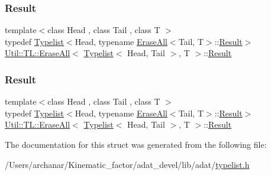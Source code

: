 \subsubsection{\texorpdfstring{Result}{Result}\hspace{0.1cm}{\footnotesize\ttfamily [1/2]}}
{\footnotesize\ttfamily template$<$class Head , class Tail , class T $>$ \\
typedef \mbox{\hyperlink{structUtil_1_1Typelist}{Typelist}}$<$Head, typename \mbox{\hyperlink{structUtil_1_1TL_1_1EraseAll}{Erase\+All}}$<$Tail, T$>$\+::\mbox{\hyperlink{structUtil_1_1TL_1_1EraseAll_3_01Typelist_3_01Head_00_01Tail_01_4_00_01T_01_4_aa724903cc91ed9eea3da277857c8f5aa}{Result}}$>$ \mbox{\hyperlink{structUtil_1_1TL_1_1EraseAll}{Util\+::\+T\+L\+::\+Erase\+All}}$<$ \mbox{\hyperlink{structUtil_1_1Typelist}{Typelist}}$<$ Head, Tail $>$, T $>$\+::\mbox{\hyperlink{structUtil_1_1TL_1_1EraseAll_3_01Typelist_3_01Head_00_01Tail_01_4_00_01T_01_4_aa724903cc91ed9eea3da277857c8f5aa}{Result}}}

\mbox{\label{structUtil_1_1TL_1_1EraseAll_3_01Typelist_3_01Head_00_01Tail_01_4_00_01T_01_4_aa724903cc91ed9eea3da277857c8f5aa}} 
\subsubsection{\texorpdfstring{Result}{Result}\hspace{0.1cm}{\footnotesize\ttfamily [2/2]}}
{\footnotesize\ttfamily template$<$class Head , class Tail , class T $>$ \\
typedef \mbox{\hyperlink{structUtil_1_1Typelist}{Typelist}}$<$Head, typename \mbox{\hyperlink{structUtil_1_1TL_1_1EraseAll}{Erase\+All}}$<$Tail, T$>$\+::\mbox{\hyperlink{structUtil_1_1TL_1_1EraseAll_3_01Typelist_3_01Head_00_01Tail_01_4_00_01T_01_4_aa724903cc91ed9eea3da277857c8f5aa}{Result}}$>$ \mbox{\hyperlink{structUtil_1_1TL_1_1EraseAll}{Util\+::\+T\+L\+::\+Erase\+All}}$<$ \mbox{\hyperlink{structUtil_1_1Typelist}{Typelist}}$<$ Head, Tail $>$, T $>$\+::\mbox{\hyperlink{structUtil_1_1TL_1_1EraseAll_3_01Typelist_3_01Head_00_01Tail_01_4_00_01T_01_4_aa724903cc91ed9eea3da277857c8f5aa}{Result}}}



The documentation for this struct was generated from the following file\+:\begin{DoxyCompactItemize}
\item 
/\+Users/archanar/\+Kinematic\+\_\+factor/adat\+\_\+devel/lib/adat/\mbox{\hyperlink{lib_2adat_2typelist_8h}{typelist.\+h}}\end{DoxyCompactItemize}
